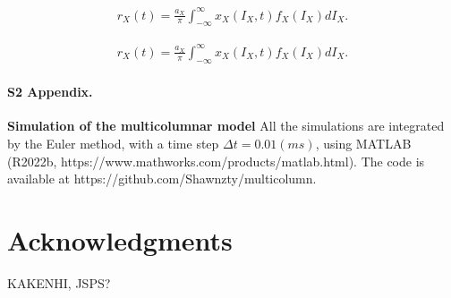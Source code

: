 \documentclass[10pt,letterpaper]{article}
\begin{document}
\begin{eqnarray}
\label{eq:13}
    r_{X}(t)= \frac{a_{X}}{\pi}\int_{-\infty}^{\infty}x_{X}(I_{X},t)f_{X}(I_{X})dI_{X}.
\end{eqnarray}

\begin{eqnarray}
\label{eq:14}
    r_{X}(t)= \frac{a_{X}}{\pi}\int_{-\infty}^{\infty}x_{X}(I_{X},t)f_{X}(I_{X})dI_{X}.
\end{eqnarray}

\paragraph*{S2 Appendix.}
\label{S2_Appendix}
{\bf Simulation of the multicolumnar model} All the simulations are integrated by the Euler method, with a time step $\Delta t=0.01 (ms)$, using MATLAB (R2022b, https://www.mathworks.com/products/matlab.html). The code is available at https://github.com/Shawnzty/multicolumn.

\section*{Acknowledgments}
KAKENHI, JSPS?

\nolinenumbers
\end{document}
